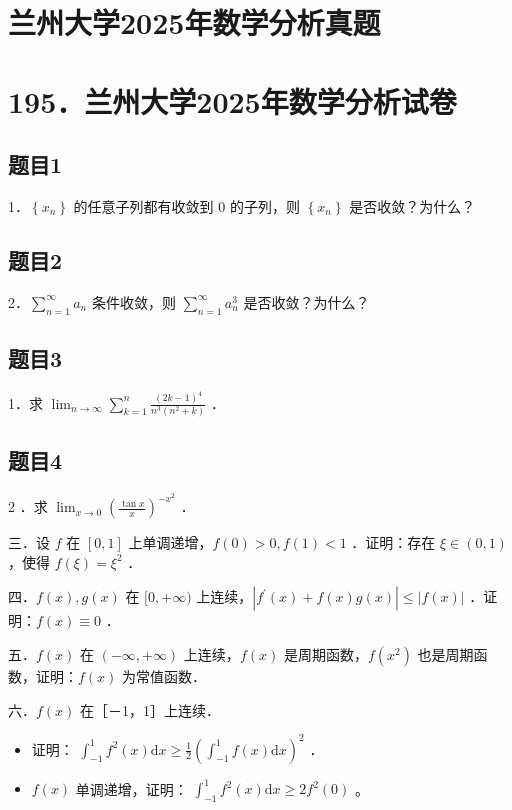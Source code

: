 \documentclass{article}
\begin{document}
\section*{兰州大学2025年数学分析真题}
\section*{195．兰州大学2025年数学分析试卷}

\subsection{题目1}
1．\(\left\{x_{n}\right\}\) 的任意子列都有收敛到 0 的子列，则 \(\left\{x_{n}\right\}\) 是否收敛？为什么？

\subsection{题目2}
2．\(\sum_{n=1}^{\infty} a_{n}\) 条件收敛，则 \(\sum_{n=1}^{\infty} a_{n}^{3}\) 是否收敛？为什么？

\subsection{题目3}
1．求 \(\lim _{n \rightarrow \infty} \sum_{k=1}^{n} \frac{(2 k-1)^{4}}{n^{3}\left(n^{2}+k\right)}\) ．

\subsection{题目4}
2 ．求 \(\lim _{x \rightarrow 0}\left(\frac{\tan x}{x}\right)^{-x^{2}}\) ．

三．设 \(f\) 在 \([0,1]\) 上单调递增，\(f(0)>0, f(1)<1\) ．证明：存在 \(\xi \in(0,1)\) ，使得 \(f(\xi)=\xi^{2}\) ．

四．\(f(x), g(x)\) 在 \([0,+\infty)\) 上连续，\(\left|f^{\prime}(x)+f(x) g(x)\right| \leq|f(x)|\) ．证明：\(f(x) \equiv 0\) ．

五．\(f(x)\) 在 \((-\infty,+\infty)\) 上连续，\(f(x)\) 是周期函数，\(f\left(x^{2}\right)\) 也是周期函数，证明：\(f(x)\) 为常值函数．

六．\(f(x)\) 在［－1，1］上连续．

\begin{itemize}

  \item[1．] 证明： \(\int_{-1}^{1} f^{2}(x) \mathrm{d} x \geq \frac{1}{2}\left(\int_{-1}^{1} f(x) \mathrm{d} x\right)^{2}\) ．

  \item[2．] \(f(x)\) 单调递增，证明： \(\int_{-1}^{1} f^{2}(x) \mathrm{d} x \geq 2 f^{2}(0)\) 。
\end{itemize}
\end{document}
